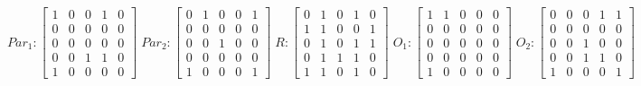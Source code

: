      $$
        Par_{1} : \begin{bmatrix}
            1 & 0 & 0 & 1 & 0 \\
            0 & 0 & 0 & 0 & 0 \\
            0 & 0 & 0 & 0 & 0 \\
			0 & 0 & 1 & 1 & 0 \\
            1 & 0 & 0 & 0 & 0 
        \end{bmatrix}
        \;
        Par_{2} : \begin{bmatrix}
            0 & 1 & 0 & 0 & 1 \\
            0 & 0 & 0 & 0 & 0 \\
            0 & 0 & 1 & 0 & 0 \\
            0 & 0 & 0 & 0 & 0 \\
            1 & 0 & 0 & 0 & 1
        \end{bmatrix}
        \;
        R : \begin{bmatrix}
            0 & 1 & 0 & 1 & 0 \\
            1 & 1 & 0 & 0 & 1 \\
            0 & 1 & 0 & 1 & 1 \\
            0 & 1 & 1 & 1 & 0 \\
            1 & 1 & 0 & 1 & 0
        \end{bmatrix}
        \;
        O_{1} : \begin{bmatrix}
            1 & 1 & 0 & 0 & 0 \\
            0 & 0 & 0 & 0 & 0 \\
            0 & 0 & 0 & 0 & 0 \\
            0 & 0 & 0 & 0 & 0 \\
            1 & 0 & 0 & 0 & 0
        \end{bmatrix}
        \;
        O_{2} : \begin{bmatrix}
            0 & 0 & 0 & 1 & 1 \\
            0 & 0 & 0 & 0 & 0 \\
            0 & 0 & 1 & 0 & 0 \\
            0 & 0 & 1 & 1 & 0 \\
            1 & 0 & 0 & 0 & 1
        \end{bmatrix}
    $$ 
